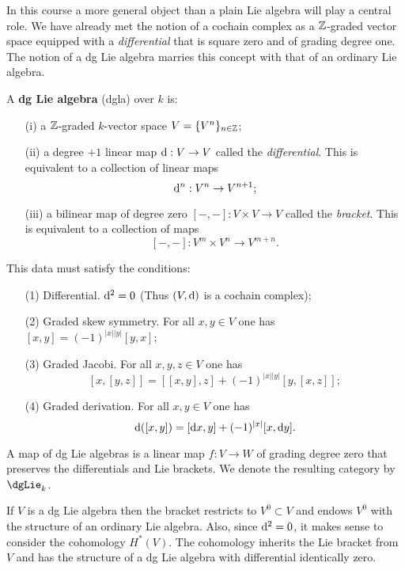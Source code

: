 \documentclass[11pt]{amsart}
\begin{document}
In this course a more general object than a plain Lie algebra will play a central role. 
We have already met the notion of a cochain complex as a $\mathbb Z$-graded vector space equipped with a {\em differential} that is square zero and of grading degree one. 
The notion of a dg Lie algebra marries this concept with that of an ordinary Lie algebra. 

\begin{dfn}
A {\bf dg Lie algebra} (dgla) over $k$ is:
\begin{enumerate}
\item[(i)] a $\mathbb Z$-graded $k$-vector space $V = \{V^n\}_{n \in \mathbb Z}$;
\item[(ii)] a degree $+1$ linear map ${\rm d} : V \to V$ called the {\em differential}.
This is equivalent to a collection of linear maps
\[
{\rm d}^n : V^n \to V^{n+1};
\]
\item[(iii)] a bilinear map of degree zero $[-,-] : V \times V \to V$ called the {\em bracket}. This is equivalent to a collection of maps
\[
[-,-] : V^m \times V^n \to V^{m+n}. 
\]
\end{enumerate}
This data must satisfy the conditions:
\begin{enumerate}
\item[(1)] Differential. ${\rm d}^2 = 0$ (Thus $(V,{\rm d})$ is a cochain complex);
\item[(2)] Graded skew symmetry. For all $x,y \in V$ one has $[x,y] = (-1)^{|x||y|} [y,x]$;
\item[(3)] Graded Jacobi. For all $x,y,z \in V$ one has
\[
[x,[y,z]] = [[x,y],z] + (-1)^{|x||y|} [y,[x,z]];
\]
\item[(4)] Graded derivation.
For all $x,y\in V$ one has
\[
{\rm d}([x,y]) = [{\rm d} x, y] + (-1)^{|x|} [x, {\rm d} y] .
\]
\end{enumerate}
A map of dg Lie algebras is a linear map $f : V \to W$ of grading degree zero that preserves the differentials and Lie brackets.
We denote the resulting category by $\dgLie_k$. 
\end{dfn}

\begin{rmk}
If $V$ is a dg Lie algebra then the bracket restricts to $V^0 \subset V$ and endows $V^0$ with the structure of an ordinary Lie algebra.
Also, since ${\rm d}^2 = 0$, it makes sense to consider the cohomology $H^*(V)$. 
The cohomology inherits the Lie bracket from $V$ and has the structure of a dg Lie algebra with differential identically zero. 
\end{rmk}
\end{document}
